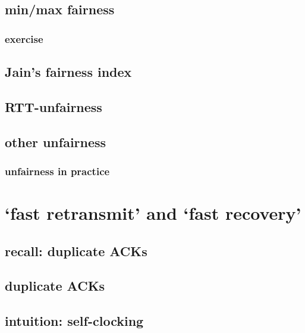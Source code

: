 \subsection{min/max fairness}


\subsubsection{exercise}


\subsection{Jain's fairness index}


\subsection{RTT-unfairness}


\subsection{other unfairness}


\subsubsection{unfairness in practice}


\section{`fast retransmit' and `fast recovery'}

\subsection{recall: duplicate ACKs}


\subsection{duplicate ACKs}

\subsection{intuition: self-clocking}


